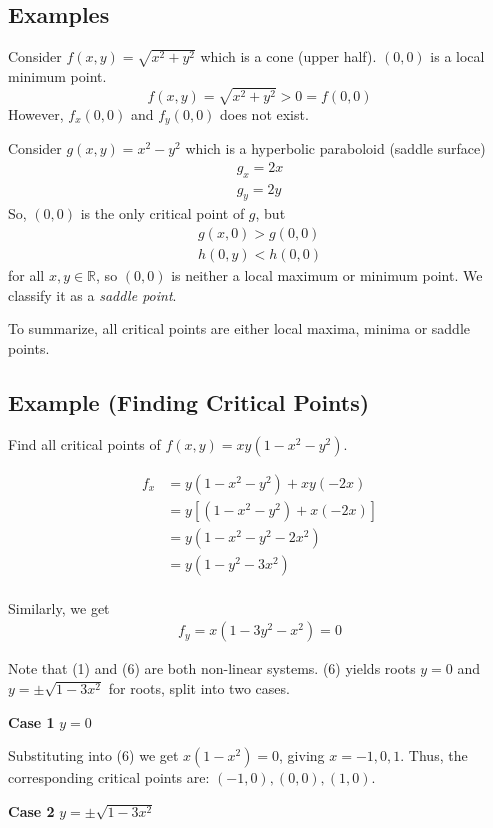 \subsection{Examples}
Consider $ f(x,y)=\sqrt{x^2+y^2} $ which is a cone (upper half).
$ (0,0) $ is a local minimum point.
\[ f(x,y)=\sqrt{x^2+y^2}>0=f(0,0) \]
However, $ f_x(0,0) $ and $ f_y(0,0) $ does not exist.

Consider $ g(x,y)=x^2-y^2 $ which is a hyperbolic paraboloid (saddle surface)
\begin{align*}
    g_x=2x\\
    g_y=2y
\end{align*}
So, $(0,0)$ is the only critical point of $ g $, but
\begin{align*}
    g(x,0)>g(0,0)\\
    h(0,y)<h(0,0)
\end{align*}
for all $ x,y\in\mathbb{R} $, so $ (0,0) $ is neither a local
maximum or minimum point. We classify it as a \emph{saddle point}.

To summarize, all critical points are either local maxima, minima
or saddle points.

\subsection{Example (Finding Critical Points)}
Find all critical points of $ f(x,y)=x y(1-x^2-y^2) $.

\begin{align}
    f_x&=y(1-x^2-y^2)+x y(-2x)\\
    &=y[(1-x^2-y^2)+x(-2x)]\\
    &=y(1-x^2-y^2-2x^2)\\
    &=y(1-y^2-3x^2)\\
\end{align}

Similarly, we get
\begin{align}
    f_y=x(1-3y^2-x^2)=0
\end{align}

Note that (1) and (6) are both non-linear systems.
(6) yields roots 
$ y=0 $ and $ y=\pm \sqrt{1-3x^2} $ for roots, split into two cases.

\textbf{Case 1} $ y=0 $

Substituting into (6) we get $ x(1-x^2)=0 $, giving $ x={-1},0,1 $. Thus,
the corresponding critical points are: $ ({-1},0),(0,0),(1,0) $.

\textbf{Case 2} $ y=\pm \sqrt{1-3x^2} $

